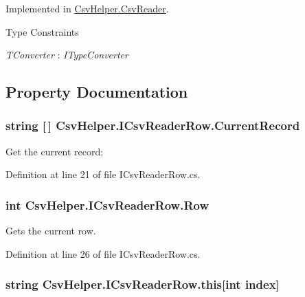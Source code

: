 Implemented in \hyperlink{a00079_a6665d63535ab6ca768ffbc76c1347e58}{Csv\-Helper.\-Csv\-Reader}.

\begin{Desc}
\item[Type Constraints]\begin{description}
\item[{\em T\-Converter} : {\em I\-Type\-Converter}]\end{description}
\end{Desc}


\subsection{Property Documentation}
\hypertarget{a00117_a4e8958e51331591b1d9e811e32bd92d0}{
\subsubsection[{Current\-Record}]{\setlength{\rightskip}{0pt plus 5cm}string \mbox{[}$\,$\mbox{]} Csv\-Helper.\-I\-Csv\-Reader\-Row.\-Current\-Record\hspace{0.3cm}{\ttfamily [get]}}}\label{a00117_a4e8958e51331591b1d9e811e32bd92d0}


Get the current record; 



Definition at line 21 of file I\-Csv\-Reader\-Row.\-cs.

\hypertarget{a00117_ac1bd960358282c70f0b85de90f00b446}{
\subsubsection[{Row}]{\setlength{\rightskip}{0pt plus 5cm}int Csv\-Helper.\-I\-Csv\-Reader\-Row.\-Row\hspace{0.3cm}{\ttfamily [get]}}}\label{a00117_ac1bd960358282c70f0b85de90f00b446}


Gets the current row. 



Definition at line 26 of file I\-Csv\-Reader\-Row.\-cs.

\hypertarget{a00117_a45d5b14c7382418d90b4c085c2bdc7dc}{
\subsubsection[{this[int index]}]{\setlength{\rightskip}{0pt plus 5cm}string Csv\-Helper.\-I\-Csv\-Reader\-Row.\-this\mbox{[}int index\mbox{]}\hspace{0.3cm}{\ttfamily [get]}}}\label{a00117_a45d5b14c7382418d90b4c085c2bdc7dc}


